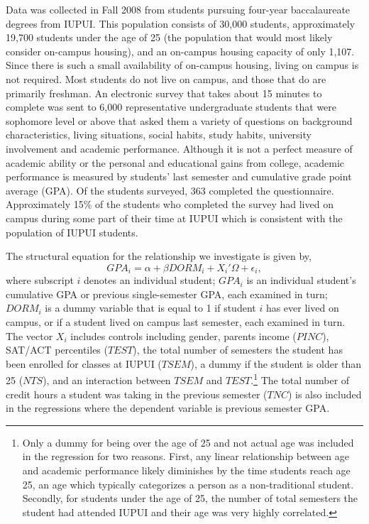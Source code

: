 \documentclass[12pt]{article}
\newcommand{\beq}{\begin{equation}}
\newcommand{\eeq}{\end{equation}}
\begin{document}
Data was collected in Fall 2008 from students pursuing four-year baccalaureate degrees from IUPUI.  This population consists of 30,000 students, approximately 19,700 students under the age of 25 (the population that would most likely consider on-campus housing), and an on-campus housing capacity of only 1,107. Since there is such a small availability of on-campus housing, living on campus is not required. Most students do not live on campus, and those that do are primarily freshman. An electronic survey that takes about 15 minutes to complete was sent to 6,000 representative undergraduate students that were sophomore level or above that asked them a variety of questions on background characteristics, living situations, social habits, study habits, university involvement and academic performance. Although it is not a perfect measure of academic ability or the personal and educational gains from college, academic performance is measured by students' last semester and cumulative grade point average (GPA).  Of the students surveyed, 363 completed the questionnaire.  Approximately 15\% of the students who completed the survey had lived on campus during some part of their time at IUPUI which is consistent with the population of IUPUI students.

The structural equation for the relationship we investigate is given by,
\beq \label{eq:model} GPA_i = \alpha + \beta DORM_i + X_i'\Omega + \epsilon_i ,\label{eq:struct} \eeq
where subscript $i$ denotes an individual student; $GPA_i$ is an individual student's cumulative GPA or previous single-semester GPA, each examined in turn; $DORM_i$ is a dummy variable that is equal to 1 if student $i$ has ever lived on campus, or if a student lived on campus last semester, each examined in turn.  The vector $X_i$ includes controls including gender, parents income ($PINC$), SAT/ACT percentiles ($TEST$), the total number of semesters the student has been enrolled for classes at IUPUI ($TSEM$), a dummy if the student is older than 25 ($NTS$), and an interaction between $TSEM$ and $TEST$.\footnote{Only a dummy for being over the age of 25 and not actual age was included in the regression for two reasons.  First, any linear relationship between age and academic performance likely diminishes by the time students reach age 25, an age which typically categorizes a person as a non-traditional student.  Secondly, for students under the age of 25, the number of total semesters the student had attended IUPUI and their age was very highly correlated.}  The total number of credit hours a student was taking in the previous semester ($TNC$) is also included in the regressions where the dependent variable is previous semester GPA.
\end{document}
